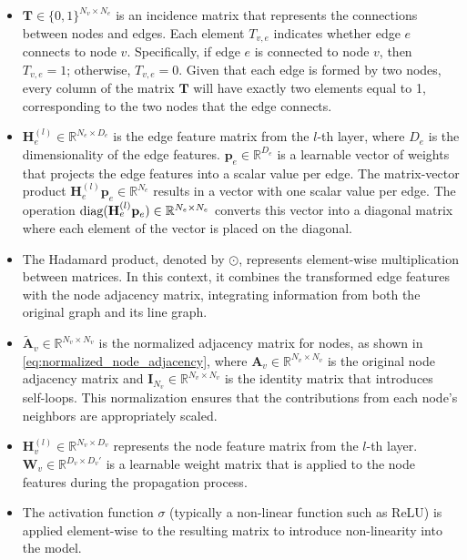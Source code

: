 \begin{itemize}
    \item \( \mathbf{T} \in \{0, 1\}^{N_v \times N_e} \) is an incidence matrix that represents the connections between nodes and edges. Each element \( T_{v,e} \) indicates whether edge \( e \) connects to node \( v \). Specifically, if edge \( e \) is connected to node \( v \), then \( T_{v,e} = 1 \); otherwise, \( T_{v,e} = 0 \). Given that each edge is formed by two nodes, every column of the matrix \( \mathbf{T} \) will have exactly two elements equal to 1, corresponding to the two nodes that the edge connects. 

    \item \( \mathbf{H}^{(l)}_e \in \mathbb{R}^{N_e \times D_e} \) is the edge feature matrix from the \( l \)-th layer, where \( D_e \) is the dimensionality of the edge features. \( \mathbf{p}_e \in \mathbb{R}^{D_e} \) is a learnable vector of weights that projects the edge features into a scalar value per edge. The matrix-vector product \( \mathbf{H}^{(l)}_e \mathbf{p}_e \in \mathbb{R}^{N_e} \) results in a vector with one scalar value per edge. The operation \( \textup{diag}(\mathbf{H}^{(l)}_e \mathbf{p}_e) \in \mathbb{R}^{N_e \times N_e} \) converts this vector into a diagonal matrix where each element of the vector is placed on the diagonal.
   
       \item The Hadamard product, denoted by \( \odot \), represents element-wise multiplication between matrices. In this context, it combines the transformed edge features with the node adjacency matrix, integrating information from both the original graph and its line graph.
    \item \( \tilde{\mathbf{A}}_v \in \mathbb{R}^{N_v \times N_v} \) is the normalized adjacency matrix for nodes, as shown in \cref{eq:normalized_node_adjacency}, where \( \mathbf{A}_v \in \mathbb{R}^{N_v \times N_v} \) is the original node adjacency matrix and \( \mathbf{I}_{N_v} \in \mathbb{R}^{N_v \times N_v} \) is the identity matrix that introduces self-loops. This normalization ensures that the contributions from each node's neighbors are appropriately scaled. 

    \item \( \mathbf{H}^{(l)}_v \in \mathbb{R}^{N_v \times D_v} \) represents the node feature matrix from the \( l \)-th layer. \( \mathbf{W}_v \in \mathbb{R}^{D_v \times D_v'} \) is a learnable weight matrix that is applied to the node features during the propagation process.
    
    \item The activation function \( \sigma \) (typically a non-linear function such as ReLU) is applied element-wise to the resulting matrix to introduce non-linearity into the model.
\end{itemize}


